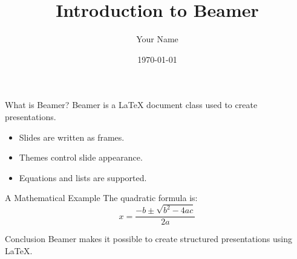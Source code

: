 \documentclass{beamer}
\title{Introduction to Beamer}
\author{Your Name}
\institute{Your College}
\date{\today}
\begin{document}
\begin{frame}
    \titlepage
\end{frame}

\begin{frame}{What is Beamer?}
    Beamer is a LaTeX document class used to create presentations.
    \begin{itemize}
        \item Slides are written as frames.
        \item Themes control slide appearance.
        \item Equations and lists are supported.
    \end{itemize}
\end{frame}

\begin{frame}{A Mathematical Example}
    The quadratic formula is:
    \[
    x = \frac{-b \pm \sqrt{b^2-4ac}}{2a}
    \]
\end{frame}

\begin{frame}{Conclusion}
    Beamer makes it possible to create structured presentations using LaTeX.
\end{frame}
\end{document}
